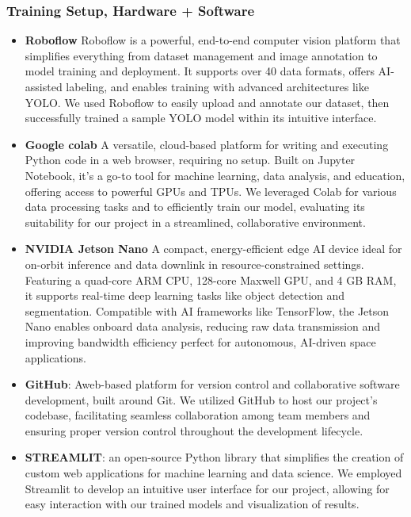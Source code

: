 \documentclass{article}
\begin{document}
\subsubsection{Training Setup, Hardware + Software}
\begin{itemize}
    \item \textbf{Roboflow}
    Roboflow is a powerful, end-to-end computer vision platform that simplifies everything from dataset management and image annotation to model training and deployment. It supports over 40 data formats, offers AI-assisted labeling, and enables training with advanced architectures like YOLO. We used Roboflow to easily upload and annotate our dataset, then successfully trained a sample YOLO model within its intuitive interface. \item \textbf{Google colab}
    A versatile, cloud-based platform for writing and executing Python code in a web browser, requiring no setup. Built on Jupyter Notebook, it's a go-to tool for machine learning, data analysis, and education, offering access to powerful GPUs and TPUs. We leveraged Colab for various data processing tasks and to efficiently train our model, evaluating its suitability for our project in a streamlined, collaborative environment. \item \textbf{NVIDIA Jetson Nano}
     A compact, energy-efficient edge AI device ideal for on-orbit inference and data downlink in resource-constrained settings. Featuring a quad-core ARM CPU, 128-core Maxwell GPU, and 4 GB RAM, it supports real-time deep learning tasks like object detection and segmentation. Compatible with AI frameworks like TensorFlow, the Jetson Nano enables onboard data analysis, reducing raw data transmission and improving bandwidth efficiency perfect for autonomous, AI-driven space applications. \item \textbf{GitHub}:
    Aweb-based platform for version control and collaborative software development, built around Git. We utilized GitHub to host our project's codebase, facilitating seamless collaboration among team members and ensuring proper version control throughout the development lifecycle. \item \textbf{STREAMLIT}: an open-source Python library that simplifies the creation of custom web applications for machine learning and data science. We employed Streamlit to develop an intuitive user interface for our project, allowing for easy interaction with our trained models and visualization of results. \end{itemize}
\end{document}
